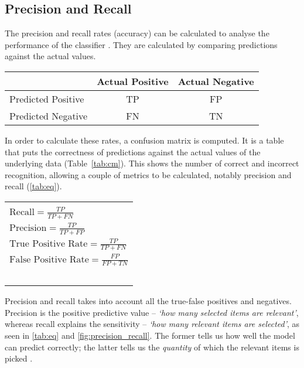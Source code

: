 \subsection{Precision and Recall}
The precision and recall rates (accuracy) can be calculated to analyse the performance of the classifier \cite{precision-recall}. They are calculated by comparing predictions against the actual values.

\parbox{\linewidth} {
  \centering
  \begin{tabular}{|l|c|c|}
    \hline
                        & Actual Positive & Actual Negative
    \\ \hline
    Predicted Positive  & TP              & FP
    \\ \hline
    Predicted Negative  & FN              & TN
    \\ \hline
  \end{tabular}

  \label{tab:cm}
}

In order to calculate these rates, a confusion matrix is computed. It is a table that puts the correctness of predictions against the actual values of the underlying data (Table~\ref{tab:cm}). This shows the number of correct and incorrect recognition, allowing a couple of metrics to be calculated, notably precision and recall (\autoref{tab:eq}).

\parbox{\linewidth} {
  \centering
  \begin{tabular}{|l|}
    \hline \\
    \( \text{Recall}              = \frac{TP}{TP + FN} \) \\[10pt]
    \( \text{Precision}           = \frac{TP}{TP + FP} \) \\[10pt]
    \( \text{True Positive Rate}  = \frac{TP}{TP + FN} \) \\[10pt]
    \( \text{False Positive Rate} = \frac{FP}{FP + TN} \) \\~\\
    \hline
  \end{tabular}
  
  \label{tab:eq}
}

Precision and recall takes into account all the true-false positives and negatives. Precision is the positive predictive value -- \textit{`how many selected items are relevant'}, whereas recall explains the sensitivity -- \textit{`how many relevant items are selected'}, as seen in \autoref{tab:eq} and \autoref{fig:precision_recall}. The former tells us how well the model can predict correctly; the latter tells us the \textit{quantity} of which the relevant items is picked \cite{precision-recall-wiki}.

